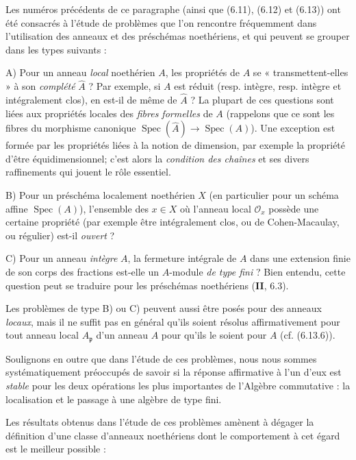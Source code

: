 \begin{env}[7.8.1]
\label{IV.2.s7.8.1-fr}
Les numéros précédents de ce paragraphe (ainsi que (6.11), (6.12) et (6.13))
ont été consacrés à l'étude de problèmes que l'on rencontre fréquemment dans
l'utilisation des anneaux et des préschémas noethériens, et qui peuvent se
grouper dans les types suivants :


A) Pour un anneau \emph{local} noethérien $A$, les propriétés de $A$ se
« transmettent-elles » à son \emph{complété} $\widehat A$ ? Par exemple, si
$A$ est réduit (resp. intègre, resp. intègre et intégralement clos), en est-il
de même de $\widehat A$ ? La plupart de ces questions sont liées aux propriétés
locales des \emph{fibres formelles} de $A$ (rappelons que ce sont les fibres du
morphisme canonique
$\operatorname{Spec}(\widehat A)\to\operatorname{Spec}(A)$). Une exception est
formée par les propriétés liées à la notion de dimension, par exemple la
propriété d'être équidimensionnel; c'est alors la \emph{condition des chaînes}
et ses divers raffinements qui jouent le rôle essentiel.

B) Pour un préschéma localement noethérien $X$ (en particulier pour un schéma
affine $\operatorname{Spec}(A)$), l'ensemble des $x\in X$ où l'anneau local
$\mathcal O_x$ possède une certaine propriété (par exemple être intégralement
clos, ou de Cohen-Macaulay, ou régulier) est-il \emph{ouvert} ?

C) Pour un anneau \emph{intègre} $A$, la fermeture intégrale de $A$ dans une
extension finie de son corps des fractions est-elle un $A$-module \emph{de type
fini} ? Bien entendu, cette question peut se traduire pour les préschémas
noethériens (\textbf{II}, 6.3).

Les problèmes de type B) ou C) peuvent aussi être posés pour des anneaux
\emph{locaux}, mais il ne suffit pas en général qu'ils soient résolus
affirmativement pour tout anneau local $A_{\mathfrak p}$ d'un anneau $A$ pour
qu'ils le soient pour $A$ (cf. (6.13.6)).

Soulignons en outre que dans l'étude de ces problèmes, nous nous sommes
systématiquement préoccupés de savoir si la réponse affirmative à l'un d'eux
est \emph{stable} pour les deux opérations les plus importantes de l'Algèbre
commutative : la localisation et le passage à une algèbre de type fini.

Les résultats obtenus dans l'étude de ces problèmes amènent à dégager la
définition d'une classe d'anneaux noethériens dont le comportement à cet égard
est le meilleur possible :
\end{env}

